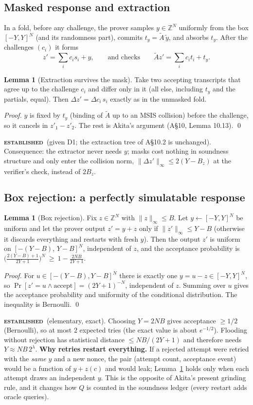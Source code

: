 \documentclass[11pt]{article}
\newcommand{\epitag}[3]{\colorbox{#2}{\textcolor{#1}{\textsc{\footnotesize\bfseries #3}}}}
\newcommand{\established}{\epitag{estgreen}{estbg}{established}}
\renewcommand{\_}{\textunderscore\allowbreak{}}
\theoremstyle{definition}
\newtheorem{lemma}[definition]{Lemma}
\begin{document}
\subsection{Masked response and extraction}
In a fold, before any challenge, the prover samples $y\in\mathbb{Z}^N$ uniformly from the box $[-Y,Y]^N$ (and its randomness part), commits $t_y=\tilde A\,\tilde y$, and absorbs $t_y$. After the challenges $(c_i)$ it forms
\[
 z'=\sum_i c_is_i+y,\qquad \text{and checks}\qquad \tilde A z' = \sum_i c_i t_i + t_y .
\]
\begin{lemma}[Extraction survives the mask]
\label{lem:extract}
Take two accepting transcripts that agree up to the challenge $c_i$ and differ only in it (all else, including $t_y$ and the partials, equal). Then $\Delta z'=\Delta c_i\,s_i$ exactly as in the unmasked fold.
\end{lemma}
\begin{proof}
$y$ is fixed by $t_y$ (binding of $\tilde A$ up to an MSIS collision) before the challenge, so it cancels in $z'_1-z'_2$. The rest is Akita's argument (A\S10, Lemma 10.13). \qed
\end{proof}
\established\ (given D1; the extraction tree of A\S10.2 is unchanged). Consequence: the extractor never needs $y$; masks cost nothing in soundness structure and only enter the collision norm, $\|\Delta z'\|_\infty\le2(Y-B_z)$ at the verifier's check, instead of $2B_z$.

\subsection{Box rejection: a perfectly simulatable response}
\label{sec:reject}
\begin{lemma}[Box rejection]
\label{lem:box}
Fix $z\in\mathbb{Z}^N$ with $\|z\|_\infty\le B$. Let $y\leftarrow[-Y,Y]^N$ be uniform and let the prover output $z'=y+z$ only if $\|z'\|_\infty\le Y-B$ (otherwise it discards everything and restarts with fresh $y$). Then the output $z'$ is uniform on $[-(Y-B),\,Y-B]^N$, independent of $z$, and the acceptance probability is $\big(\tfrac{2(Y-B)+1}{2Y+1}\big)^N\ \ge\ 1-\tfrac{2NB}{2Y+1}$.
\end{lemma}
\begin{proof}
For $u\in[-(Y-B),Y-B]^N$ there is exactly one $y=u-z\in[-Y,Y]^N$, so $\Pr[z'=u\wedge\text{accept}]=(2Y+1)^{-N}$, independent of $z$. Summing over $u$ gives the acceptance probability and uniformity of the conditional distribution. The inequality is Bernoulli. \qed
\end{proof}
\established\ (elementary, exact). Choosing $Y=2NB$ gives acceptance $\ge1/2$ (Bernoulli), so at most $2$ expected tries (the exact value is about $e^{-1/2}$). Flooding without rejection has statistical distance $\le NB/(2Y+1)$ and therefore needs $Y\approx NB\,2^{\lambda}$.
\textbf{Why retries restart everything.} If a rejected attempt were retried with the \emph{same} $y$ and a new nonce, the pair (attempt count, acceptance event) would be a function of $y+z(c)$ and would leak; Lemma~\ref{lem:box} holds only when each attempt draws an independent $y$. This is the opposite of Akita's present grinding rule, and it changes how $Q$ is counted in the soundness ledger (every restart adds oracle queries).
\end{document}
